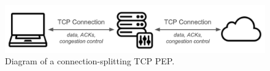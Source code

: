 \begin{figure}
    \centering
    \includegraphics[width=\linewidth]{figures/pep_img_example.jpg}
    \caption{Diagram of a connection-splitting TCP PEP.}
    \label{fig:pep}
\end{figure}
